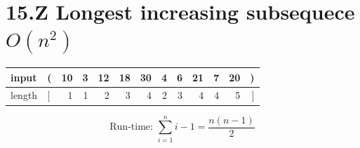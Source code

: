 \documentclass[a4paper]{article}
\begin{document}
\section*{15.Z Longest increasing subsequece $O(n^2)$}
    \begin{tabular}{l|l r r r r r r r r r r r}
         input & ( & 10 & 3 & 12 & 18 & 30 & 4 & 6 & 21 & 7 & 20 & )\\
         \hline
         length& [ & 1 & 1 & 2 & 3 & 4 & 2 & 3 & 4 & 4 & 5 & ]
    \end{tabular}
    \begin{equation*}
        \text{Run-time: }\sum_{i=1}^{n}{i-1}=\frac{n(n-1)}{2}
    \end{equation*}
\end{document}
